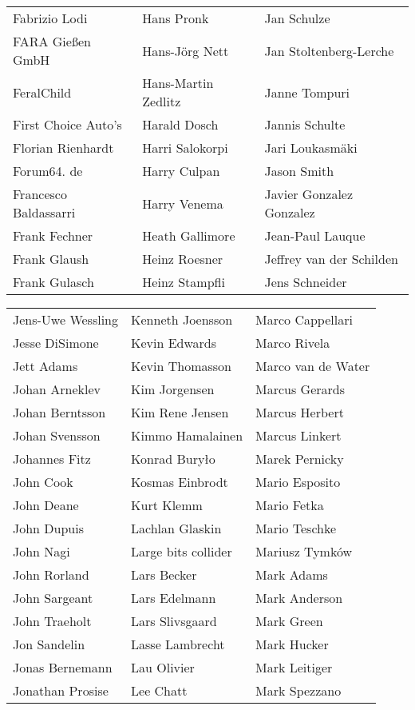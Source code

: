 \begin{small}
\begin{tabular}{p{4cm}p{4cm}p{4cm}}
Fabrizio Lodi & Hans Pronk & Jan Schulze \\
FARA Gießen GmbH & Hans-Jörg Nett & Jan Stoltenberg-Lerche \\
FeralChild & Hans-Martin Zedlitz & Janne Tompuri \\
First Choice Auto's & Harald Dosch & Jannis Schulte \\
Florian Rienhardt & Harri Salokorpi & Jari Loukasmäki \\
Forum64. de & Harry Culpan & Jason Smith \\
Francesco Baldassarri & Harry Venema & Javier Gonzalez Gonzalez \\
Frank Fechner & Heath Gallimore & Jean-Paul Lauque \\
Frank Glaush & Heinz Roesner & Jeffrey van der Schilden \\
Frank Gulasch & Heinz Stampfli & Jens Schneider \\
\end{tabular}
\newpage
\setlength{\tabcolsep}{1mm}
\begin{tabular}{p{4cm}p{4cm}p{4cm}}
Jens-Uwe Wessling & Kenneth Joensson & Marco Cappellari \\
Jesse DiSimone & Kevin Edwards & Marco Rivela \\
Jett Adams & Kevin Thomasson & Marco van de Water \\
Johan Arneklev & Kim Jorgensen & Marcus Gerards \\
Johan Berntsson & Kim Rene Jensen & Marcus Herbert \\
Johan Svensson & Kimmo Hamalainen & Marcus Linkert \\
Johannes Fitz & Konrad Buryło & Marek Pernicky \\
John Cook & Kosmas Einbrodt & Mario Esposito \\
John Deane & Kurt Klemm & Mario Fetka \\
John Dupuis & Lachlan Glaskin & Mario Teschke \\
John Nagi & Large bits collider & Mariusz Tymków \\
John Rorland & Lars Becker & Mark Adams \\
John Sargeant & Lars Edelmann & Mark Anderson \\
John Traeholt & Lars Slivsgaard & Mark Green \\
Jon Sandelin & Lasse Lambrecht & Mark Hucker \\
Jonas Bernemann & Lau Olivier & Mark Leitiger \\
Jonathan Prosise & Lee Chatt & Mark Spezzano \\

\end{tabular}
\end{small}
